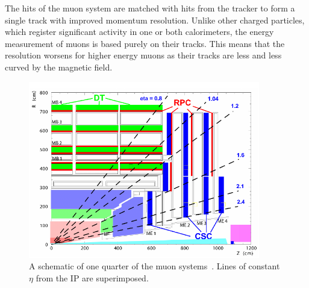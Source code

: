 The hits of the muon system are matched with hits from the tracker to form a single track with
improved momentum resolution. Unlike other charged particles, which register significant activity in
one or both calorimeters, the energy measurement of muons is based purely on their tracks. This means
that the resolution worsens for higher energy muons as their tracks are less and less curved by
the magnetic field.


\begin{figure}[ht]
 \begin{center}
   \includegraphics[width=0.90\textwidth]{figures/experiment/muons.pdf}
      \end{center}
\caption{A schematic of one quarter of the muon systems~\cite{Chatrchyan:2008zzk}.
Lines of constant $\eta$ from the IP are superimposed.}
\label{fig:muonsystem}
\end{figure}


